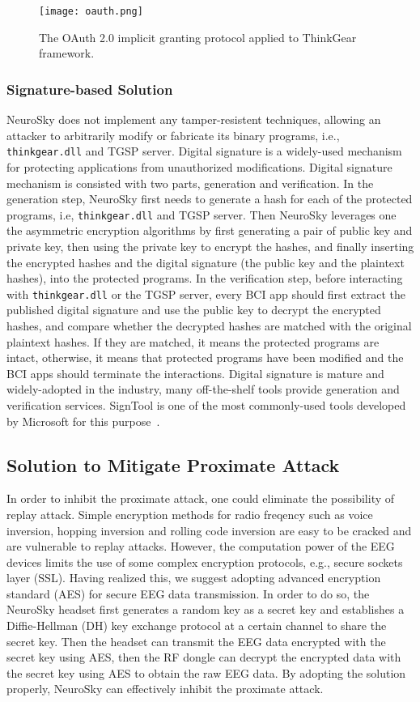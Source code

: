 \begin{figure}[!htb]
        \centering
        \texttt{[image: oauth.png]}
	\caption{The OAuth 2.0 implicit granting protocol applied to ThinkGear framework. }
        \label{fig:oauth}
\end{figure}

\subsubsection{Signature-based Solution}
NeuroSky does not implement any tamper-resistent techniques, allowing an attacker to arbitrarily modify or fabricate its binary programs, i.e., \texttt{thinkgear.dll} and TGSP server. Digital signature is a widely-used mechanism for protecting applications from unauthorized modifications. Digital signature mechanism is consisted with two parts, generation and verification. In the generation step, NeuroSky first needs to generate a hash for each of the protected programs, i.e, \texttt{thinkgear.dll} and TGSP server. Then NeuroSky leverages one the asymmetric encryption algorithms by first generating a pair of public key and private key, then using the private key to encrypt the hashes, and finally inserting the encrypted hashes and the digital signature (the public key and the plaintext hashes), into the protected programs. In the verification step, before interacting with \texttt{thinkgear.dll} or the TGSP server, every BCI app should first extract the published digital signature and use the public key to decrypt the encrypted hashes, and compare whether the decrypted hashes are matched with the original plaintext hashes. If they are matched, it means the protected programs are intact, otherwise, it means that protected programs have been modified and the BCI apps should terminate the interactions. Digital signature is mature and widely-adopted in the industry, many off-the-shelf tools provide generation and verification services. SignTool is one of the most commonly-used tools developed by Microsoft for this purpose~\cite{signtool}.

\subsection{Solution to Mitigate Proximate Attack}
In order to inhibit the proximate attack, one could eliminate the possibility of replay attack. Simple encryption methods for radio freqency such as voice inversion, hopping inversion and rolling code inversion are easy to be cracked and are vulnerable to replay attacks. However, the computation power of the EEG devices limits the use of some complex encryption protocols, e.g., secure sockets layer (SSL). Having realized this, we suggest adopting advanced encryption standard (AES) for secure EEG data transmission. In order to do so, the NeuroSky headset first generates a random key as a secret key and establishes a Diffie-Hellman (DH) key exchange protocol at a certain channel to share the secret key. Then the headset can transmit the EEG data encrypted with the secret key using AES, then the RF dongle can decrypt the encrypted data with the secret key using AES to obtain the raw EEG data. By adopting the solution properly, NeuroSky can effectively inhibit the proximate attack.
